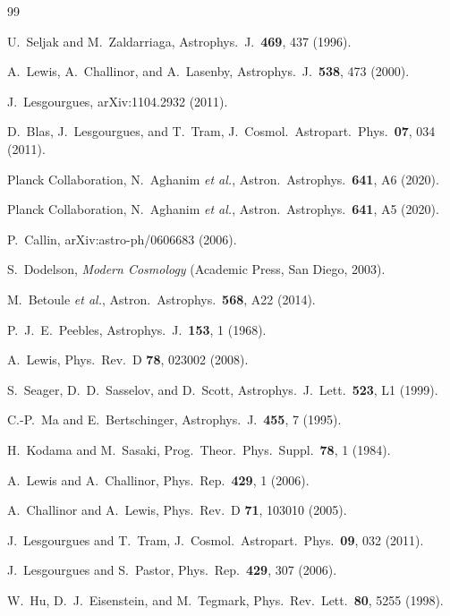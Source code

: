 \begin{thebibliography}{99}

U.~Seljak and M.~Zaldarriaga, Astrophys.\ J.\ \textbf{469}, 437 (1996).

A.~Lewis, A.~Challinor, and A.~Lasenby, Astrophys.\ J.\ \textbf{538}, 473 (2000).

J.~Lesgourgues, arXiv:1104.2932 (2011).

D.~Blas, J.~Lesgourgues, and T.~Tram, J.\ Cosmol.\ Astropart.\ Phys.\ \textbf{07}, 034 (2011).

Planck Collaboration, N.~Aghanim \textit{et al.}, Astron.\ Astrophys.\ \textbf{641}, A6 (2020).

Planck Collaboration, N.~Aghanim \textit{et al.}, Astron.\ Astrophys.\ \textbf{641}, A5 (2020).

P.~Callin, arXiv:astro-ph/0606683 (2006).

S.~Dodelson, \textit{Modern Cosmology} (Academic Press, San Diego, 2003).

M.~Betoule \textit{et al.}, Astron.\ Astrophys.\ \textbf{568}, A22 (2014).

P.~J.~E.~Peebles, Astrophys.\ J.\ \textbf{153}, 1 (1968).

A.~Lewis, Phys.\ Rev.\ D \textbf{78}, 023002 (2008).

S.~Seager, D.~D.~Sasselov, and D.~Scott, Astrophys.\ J.\ Lett.\ \textbf{523}, L1 (1999).

C.-P.~Ma and E.~Bertschinger, Astrophys.\ J.\ \textbf{455}, 7 (1995).

H.~Kodama and M.~Sasaki, Prog.\ Theor.\ Phys.\ Suppl.\ \textbf{78}, 1 (1984).

A.~Lewis and A.~Challinor, Phys.\ Rep.\ \textbf{429}, 1 (2006).

A.~Challinor and A.~Lewis, Phys.\ Rev.\ D \textbf{71}, 103010 (2005).

J.~Lesgourgues and T.~Tram, J.\ Cosmol.\ Astropart.\ Phys.\ \textbf{09}, 032 (2011).

J.~Lesgourgues and S.~Pastor, Phys.\ Rep.\ \textbf{429}, 307 (2006).

W.~Hu, D.~J.~Eisenstein, and M.~Tegmark, Phys.\ Rev.\ Lett.\ \textbf{80}, 5255 (1998).


\end{thebibliography}
